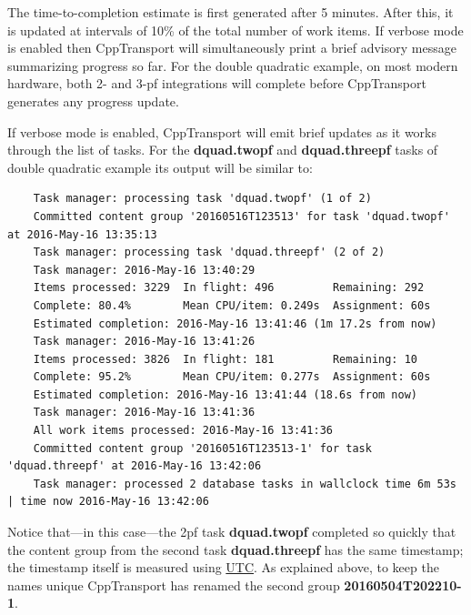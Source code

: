 \documentclass[11pt,a4paper]{article}
\newcommand{\repoobject}[1]{{\ttfamily\bfseries\small #1}}
\newcommand{\packagefont}{\sffamily}
\newcommand{\CppTransport}{{\packagefont CppTransport}}
\begin{document}
\begin{itemize}
    The time-to-completion estimate is first generated after 5 minutes.
    After this, it is updated at intervals of 10\% of the total number
    of work items.
    If verbose mode is enabled then {\CppTransport} will simultaneously
    print a brief advisory message summarizing progress so far.
    For the double quadratic example,
    on most modern hardware, both 2- and 3-pf integrations will complete
    before {\CppTransport} generates any progress update.
\end{itemize}
If verbose mode is enabled, {\CppTransport} will emit brief updates
as it works through the list of tasks.
For the
\repoobject{dquad.twopf}
and
\repoobject{dquad.threepf}
tasks of 
double quadratic example
its output will be similar to:
\begin{verbatim}
    Task manager: processing task 'dquad.twopf' (1 of 2)
    Committed content group '20160516T123513' for task 'dquad.twopf' at 2016-May-16 13:35:13
    Task manager: processing task 'dquad.threepf' (2 of 2)
    Task manager: 2016-May-16 13:40:29
    Items processed: 3229  In flight: 496         Remaining: 292         
    Complete: 80.4%        Mean CPU/item: 0.249s  Assignment: 60s        
    Estimated completion: 2016-May-16 13:41:46 (1m 17.2s from now)                  
    Task manager: 2016-May-16 13:41:26
    Items processed: 3826  In flight: 181         Remaining: 10          
    Complete: 95.2%        Mean CPU/item: 0.277s  Assignment: 60s        
    Estimated completion: 2016-May-16 13:41:44 (18.6s from now)                     
    Task manager: 2016-May-16 13:41:36
    All work items processed: 2016-May-16 13:41:36                                  
    Committed content group '20160516T123513-1' for task 'dquad.threepf' at 2016-May-16 13:42:06
    Task manager: processed 2 database tasks in wallclock time 6m 53s | time now 2016-May-16 13:42:06
\end{verbatim}
Notice that---in this case---the 2pf task \repoobject{dquad.twopf} completed so quickly that
the content group from the second task
\repoobject{dquad.threepf}
has the same timestamp;
the timestamp itself is measured using
\href{https://en.wikipedia.org/wiki/Coordinated_Universal_Time}{UTC}.
As explained above, to keep the names unique {\CppTransport}
has renamed the second group
\repoobject{20160504T202210-1}.
\end{document}
